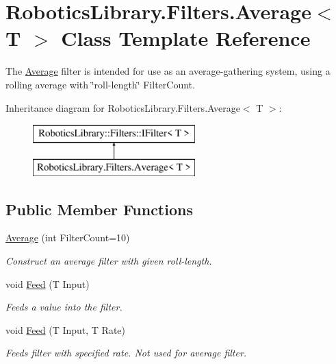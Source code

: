 \hypertarget{class_robotics_library_1_1_filters_1_1_average}{}\section{Robotics\+Library.\+Filters.\+Average$<$ T $>$ Class Template Reference}
\label{class_robotics_library_1_1_filters_1_1_average}


The \hyperlink{class_robotics_library_1_1_filters_1_1_average}{Average} filter is intended for use as an average-\/gathering system, using a rolling average with \char`\"{}roll-\/length\char`\"{} {\ttfamily Filter\+Count}. 


Inheritance diagram for Robotics\+Library.\+Filters.\+Average$<$ T $>$\+:\begin{figure}[H]
\begin{center}
\leavevmode
\includegraphics[height=2.000000cm]{class_robotics_library_1_1_filters_1_1_average}
\end{center}
\end{figure}
\subsection*{Public Member Functions}
\begin{DoxyCompactItemize}
\item 
\hyperlink{class_robotics_library_1_1_filters_1_1_average_aa1f1ba91014e9fe0b966650b9ccbf514}{Average} (int Filter\+Count=10)
\begin{DoxyCompactList}\small\item\em Construct an average filter with given roll-\/length. \end{DoxyCompactList}\item 
void \hyperlink{class_robotics_library_1_1_filters_1_1_average_a27479a3706425bb721a7694acd388cdd}{Feed} (T Input)
\begin{DoxyCompactList}\small\item\em Feeds a value into the filter. \end{DoxyCompactList}\item 
void \hyperlink{class_robotics_library_1_1_filters_1_1_average_a009ada38087402e4c8f5c3f3390123c8}{Feed} (T Input, T Rate)
\begin{DoxyCompactList}\small\item\em Feeds filter with specified rate. Not used for average filter. \end{DoxyCompactList}\end{DoxyCompactItemize}
